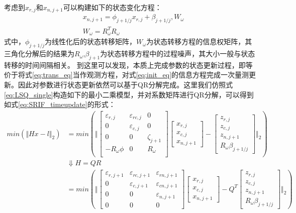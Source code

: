 考虑到\(x_{r,j}\)和\(x_{n,j+1}\)可以构建如下的状态变化方程：
\begin{equation}
	\begin{aligned}
	& x_{n,j+1} = \phi_{j+1/j}x_{r,j}+ \beta_{j+1/j},W_{\omega}   \\ 
	& W_{\omega}=R_{\omega}^{T}R_{\omega}
	\end{aligned}
	\label{eq:trans_eq}
\end{equation}
式中，\(\phi_{j+1/j}\)为线性化后的状态转移矩阵，\(W_{\omega}\)为状态转移方程的信息权矩阵，其三角化分解后的结果为\(R_{\omega}\),\(\beta_{j+1}\)为状态转移方程中的过程噪声，其大小一般与状态转移的时间间隔相关。
到这里可以发现，本质上完成参数的状态更新过程，即等价于将式\eqref{eq:trans_eq}当作观测方程，对式\eqref{eq:init_eq}的信息方程完成一次量测更新。因此对参数进行状态更新依然可以基于QR分解完成。这里我们仿照式\eqref{eq:LSQ_single}构造如下的最小二乘模型，并对系数矩阵进行QR分解，可以得到如式\eqref{eq:SRIF_timeupdate}的形式：
\begin{equation}
  \begin{aligned}
	 min(\Vert Hx-l \Vert_{2}) & = min(\Vert
	 \begin{bmatrix}
		\varepsilon_{r,j} & \varepsilon_{rc,j} & 0 \\
		0 & \varepsilon_{c,j} & 0 \\
		0 & 0 & \zeta_{j+1} \\
		-R_{\omega}\phi & 0 & R_{\omega}\\
	\end{bmatrix}
	\begin{bmatrix}
		x_{r,j}\\
		x_{c,j}\\
		x_{n,j+1}
	\end{bmatrix}
	-
	\begin{bmatrix}
		z_{r,j}\\
		z_{c,j}\\
		z_{n,j+1} \\
		R_{\omega}\beta_{j+1/j}
	\end{bmatrix}
	\Vert_{2} )\\
	& \Downarrow H = QR \\
	& = min(\Vert 
	\begin{bmatrix}
	\varepsilon_{r,j+1} & \varepsilon_{rc,j+1} & \varepsilon_{rn,j+1} \\
	0 & \varepsilon_{c,j+1} & \varepsilon_{cn,j+1} \\
	0 & 0 & \varepsilon_{n,j+1}\\
	0 & 0 & 0
	\end{bmatrix}
	\begin{bmatrix}
		x_{r,j}\\
		x_{c,j}\\
		x_{n,j+1}
	\end{bmatrix}
	-
	Q^{T}
	\begin{bmatrix}
		z_{r,j}\\
		z_{c,j}\\
		z_{n,j+1} \\
		R_{\omega}\beta_{j+1/j}
	\end{bmatrix}
	\Vert_{2})
  \end{aligned}	
  \label{eq:SRIF_timeupdate}
\end{equation}
